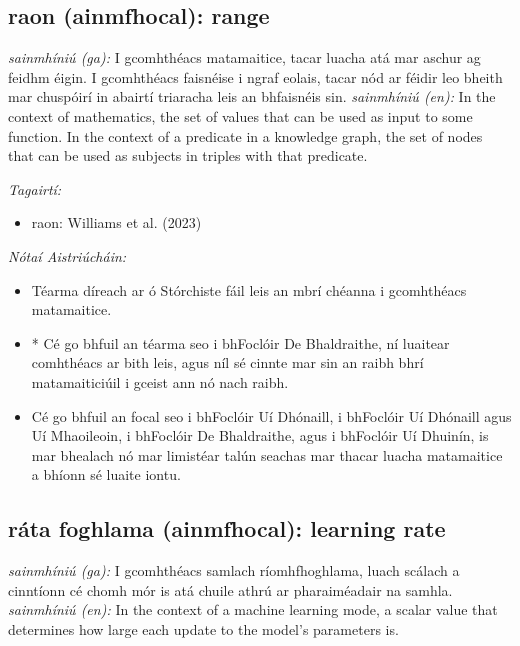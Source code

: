\documentclass{article}
\begin{document}
\subsection*{raon (ainmfhocal): range} 
 \noindent \textit{sainmhíniú (ga):} I gcomhthéacs matamaitice, tacar luacha atá mar aschur ag feidhm éigin. I gcomhthéacs faisnéise i ngraf eolais, tacar nód ar féidir leo bheith mar chuspóirí in abairtí triaracha leis an bhfaisnéis sin.
\newline\newline
 \noindent \textit{sainmhíniú (en):} In the context of mathematics, the set of values that can be used as input to some function. In the context of a predicate in a knowledge graph, the set of nodes that can be used as subjects in triples with that predicate.
\newline

 \noindent \textit{Tagairtí:}
\begin{itemize}
	\item raon: Williams et al. (2023) \cite{storchiste}
\end{itemize}

 \noindent \textit{Nótaí Aistriúcháin:}
\begin{itemize}
	\item Téarma díreach ar ó Stórchiste fáil leis an mbrí chéanna i gcomhthéacs matamaitice.
	\item * Cé go bhfuil an téarma seo i bhFoclóir De Bhaldraithe, ní luaitear comhthéacs ar bith leis, agus níl sé cinnte mar sin an raibh bhrí matamaiticiúil i gceist ann nó nach raibh.
	\item Cé go bhfuil an focal seo i bhFoclóir Uí Dhónaill, i bhFoclóir Uí Dhónaill agus Uí Mhaoileoin, i bhFoclóir De Bhaldraithe, agus i bhFoclóir Uí Dhuinín, is mar bhealach nó mar limistéar talún seachas mar thacar luacha matamaitice a bhíonn sé luaite iontu.
\end{itemize}


\subsection*{ráta foghlama (ainmfhocal): learning rate} 
 \noindent \textit{sainmhíniú (ga):} I gcomhthéacs samlach ríomhfhoghlama, luach scálach a cinntíonn cé chomh mór is atá chuile athrú ar pharaiméadair na samhla.
\newline\newline
 \noindent \textit{sainmhíniú (en):} In the context of a machine learning mode, a scalar value that determines how large each update to the model's parameters is.
\newline
\end{document}
